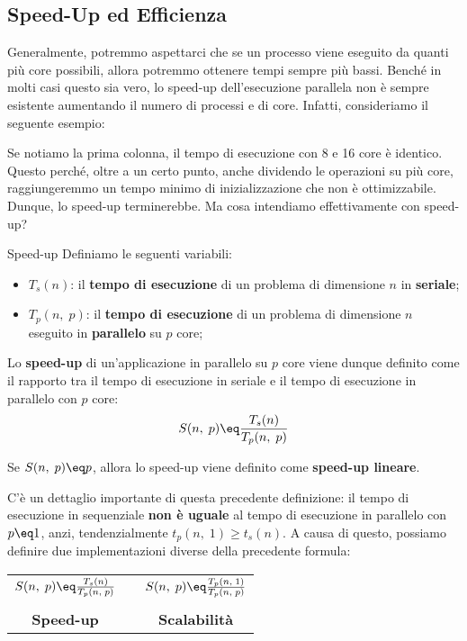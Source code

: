 \subsection{Speed-Up ed Efficienza}

Generalmente, potremmo aspettarci che se un processo viene eseguito da quanti più core possibili, allora potremmo ottenere tempi sempre più bassi. Benché in molti casi questo sia vero, lo speed-up dell'esecuzione parallela non è sempre esistente aumentando il numero di processi e di core. Infatti, consideriamo il seguente esempio:


Se notiamo la prima colonna, il tempo di esecuzione con 8 e 16 core è identico. Questo perché, oltre a un certo punto, anche dividendo le operazioni su più core, raggiungeremmo un tempo minimo di inizializzazione che non è ottimizzabile. Dunque, lo speed-up terminerebbe. Ma cosa intendiamo effettivamente con speed-up?

\begin{definition}{Speed-up}
    Definiamo le seguenti variabili:
    \begin{itemize}
        \item $T_s(n)$: il \textbf{tempo di esecuzione} di un problema di dimensione $n$ in \textbf{seriale};
        \item $T_p(n, \; p)$: il \textbf{tempo di esecuzione} di un problema di dimensione $n$ eseguito in \textbf{parallelo} su $p$ core;
    \end{itemize}

    Lo \textbf{speed-up} di un'applicazione in parallelo su $p$ core viene dunque definito come il rapporto tra il tempo di esecuzione in seriale e il tempo di esecuzione in parallelo con $p$ core:
    \[ S(n, \; p) \eq \frac{T_s(n)}{T_p(n, \; p)} \]

    Se $S(n, \; p) \eq p$, allora lo speed-up viene definito come \textbf{speed-up lineare}.
\end{definition}

C'è un dettaglio importante di questa precedente definizione: il tempo di esecuzione in sequenziale \textbf{non è uguale} al tempo di esecuzione in parallelo con $p \eq 1$, anzi, tendenzialmente $t_p(n, \; 1) \geq t_s(n)$. A causa di questo, possiamo definire due implementazioni diverse della precedente formula:

\begin{center}
    \begin{tabular}{c c c}
        $S(n, \; p) \eq \frac{T_s(n)}{T_p(n, \; p)}$ & \quad \quad \quad \quad & $S(n, \; p) \eq \frac{T_p(n, \; 1)}{T_p(n, \; p)}$ \\ & & \\
        \textbf{Speed-up} & & \textbf{Scalabilità}
    \end{tabular}
\end{center}

